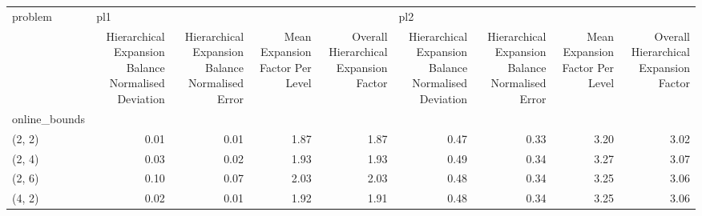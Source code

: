 \begin{tabular}{lrrrrrrrr}
\toprule
problem & \multicolumn{4}{l}{pl1} & \multicolumn{4}{l}{pl2} \\
{} & Hierarchical Expansion Balance Normalised Deviation & Hierarchical Expansion Balance Normalised Error & Mean Expansion Factor Per Level & Overall Hierarchical Expansion Factor & Hierarchical Expansion Balance Normalised Deviation & Hierarchical Expansion Balance Normalised Error & Mean Expansion Factor Per Level & Overall Hierarchical Expansion Factor \\
online\_bounds &                                                     &                                                 &                                 &                                       &                                                     &                                                 &                                 &                                       \\
\midrule
(2, 2)        &                                               0.01 &                                            0.01 &                            1.87 &                                  1.87 &                                               0.47 &                                            0.33 &                            3.20 &                                  3.02 \\
(2, 4)        &                                               0.03 &                                            0.02 &                            1.93 &                                  1.93 &                                               0.49 &                                            0.34 &                            3.27 &                                  3.07 \\
(2, 6)        &                                               0.10 &                                            0.07 &                            2.03 &                                  2.03 &                                               0.48 &                                            0.34 &                            3.25 &                                  3.06 \\
(4, 2)        &                                               0.02 &                                            0.01 &                            1.92 &                                  1.91 &                                               0.48 &                                            0.34 &                            3.25 &                                  3.06 \\

\end{tabular}
